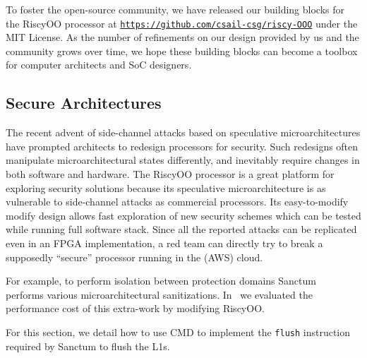 \documentclass[conference]{IEEEtran}
\begin{document}
To foster the open-source community, we have released our building blocks for the RiscyOO processor at \texttt{\url{https://github.com/csail-csg/riscy-OOO}} under the MIT License.
As the number of refinements on our design provided by us and the community grows over time, we hope these building blocks can become a toolbox for computer architects and SoC designers.

\subsection{Secure Architectures}
The recent advent of side-channel attacks based on speculative microarchitectures have prompted architects to redesign processors for security.
Such redesigns often manipulate microarchitectural states differently, and inevitably require changes in both software and hardware.
The RiscyOO processor is a great platform for exploring security solutions because its speculative microarchitecture is as vulnerable to side-channel attacks as commercial processors.
Its easy-to-modify modify design allows fast exploration of new security schemes which can be tested while running full software stack.
Since all the reported attacks can be replicated even in an FPGA implementation, a red team can directly try to break a supposedly ``secure'' processor running in the (AWS) cloud.

For example, to perform isolation between protection domains Sanctum~\cite{sanctum} performs various microarchitectural sanitizations.
In~\cite{mi6} we evaluated the performance cost of this extra-work by modifying RiscyOO.

For this section, we detail how to use CMD to implement the \verb|flush|
instruction required by Sanctum to flush the L1s.

% 
\end{document}
